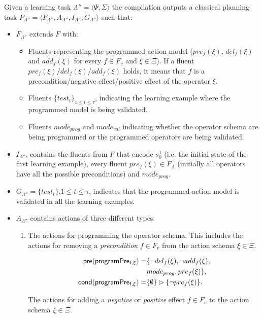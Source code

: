 \documentclass[letterpaper]{article} %
\newcommand{\tup}[1]{{\langle #1 \rangle}}
\newcommand{\pre}{\mathsf{pre}}     %
\newcommand{\cond}{\mathsf{cond}}   %
\begin{document}
Given a learning task $\Lambda''=\tup{\Psi,\Sigma}$ the compilation outputs a classical planning task $P_{\Lambda''}=\tup{F_{\Lambda''},A_{\Lambda''},I_{\Lambda''},G_{\Lambda''}}$ such that:
\begin{itemize}
\item $F_{\Lambda''}$ extends $F$ with:
\begin{itemize}
\item Fluents representing the programmed action model ($pre_f(\xi)$, $del_f(\xi)$ and $add_f(\xi)$ for every $f\in F_v$ and $\xi \in \Xi$). If a fluent $pre_f(\xi)/del_f(\xi)/add_f(\xi)$ holds, it means that $f$ is a precondition/negative effect/positive effect of the operator $\xi$. 
\item Fluents $\{test_t\}_{1\leq t\leq \tau}$, indicating the learning example where the programmed model is being validated.
\item Fluents $mode_{prog}$ and $mode_{val}$ indicating whether the operator schema are being programmed or the programmed operators are being validated.
\end{itemize}
\item $I_{\Lambda''}$, contains the fluents from $F$ that encode $s_0^1$ (i.e. the initial state of the first learning example), every fluent $pre_f(\xi)\in F_{\Lambda}$ (initially all operators have all the possible preconditions) and $mode_{prog}$. 
\item $G_{\Lambda''}=\{test_t\}$,{\small $1\leq t\leq \tau$}, indicates that the programmed action model is validated in all the learning examples.
\item $A_{\Lambda''}$ contains actions of three different types:
\begin{enumerate}
\item The actions for programming the operator schema. This includes the actions for removing a {\em precondition} $f\in F_v$ from the action schema $\xi\in\Xi$.

\begin{small}
\begin{align*}
\hspace*{7pt}\pre(\mathsf{programPre_{f,\xi}})=&\{\neg del_{f}(\xi),\neg add_{f}(\xi),\\
& mode_{prog},pre_{f}(\xi)\},\\    
\cond(\mathsf{programPre_{f,\xi}})=&\{\emptyset\}\rhd\{\neg pre_{f}(\xi)\}.
\end{align*}
\end{small}

The actions for adding a {\em negative} or {\em positive} effect $f\in F_v$ to the action schema $\xi\in\Xi$.


\end{enumerate}
\end{itemize}
\end{document}
